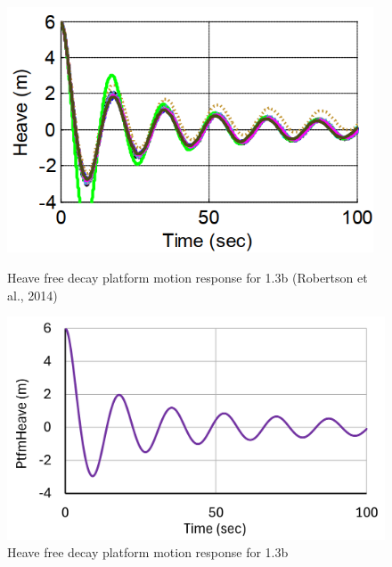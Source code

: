 \documentclass[a4paper, 11pt]{article}
\begin{document}
\begin{figure}[H]
    \begin{minipage}{0.47\textwidth}
        \centering
        \includegraphics[width=0.97\textwidth]{1.3b_heave.png}
        \caption{\small Heave free decay platform motion response for 1.3b (Robertson et al., 2014)}
        \label{fig:1.3b_heave}
    \end{minipage}
    \hfill
    \begin{minipage}{0.5\textwidth}
        \centering
        \includegraphics[width=1\textwidth]{1.3b_heave_mine.png}
        \caption{\small Heave free decay platform motion response for 1.3b}
        \label{fig:1.3b_heave_mine}
    \end{minipage}
\end{figure}
\end{document}
